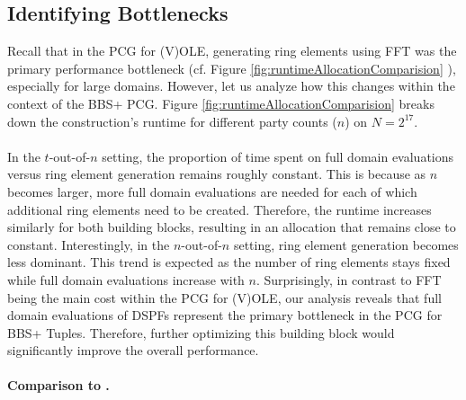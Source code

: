 \subsection{Identifying Bottlenecks}
\label{subsec:bbspPcgBottlenecks}
Recall that in the PCG for (V)OLE, generating ring elements using FFT was the primary performance bottleneck (cf. Figure \ref{fig:runtimeAllocationComparision} ), especially for large domains. However, let us analyze how this changes within the context of the BBS+ PCG. Figure \ref{fig:runtimeAllocationComparision} breaks down the construction's runtime for different party counts ($n$) on $N=2^{17}$.
\\\\
In the $t$-out-of-$n$ setting, the proportion of time spent on full domain evaluations versus ring element generation remains roughly constant. This is because as $n$ becomes larger, more full domain evaluations are needed for each of which additional ring elements need to be created. Therefore, the runtime increases similarly for both building blocks, resulting in an allocation that remains close to constant. Interestingly, in the $n$-out-of-$n$ setting, ring element generation becomes less dominant. This trend is expected as the number of ring elements stays fixed while full domain evaluations increase with $n$. Surprisingly, in contrast to FFT being the main cost within the PCG for (V)OLE, our analysis reveals that full domain evaluations of DSPFs represent the primary bottleneck in the PCG for BBS+ Tuples. Therefore, further optimizing this building block would significantly improve the overall performance.
\\\\
\textbf{Comparison to \cite{abram2022low}.}
